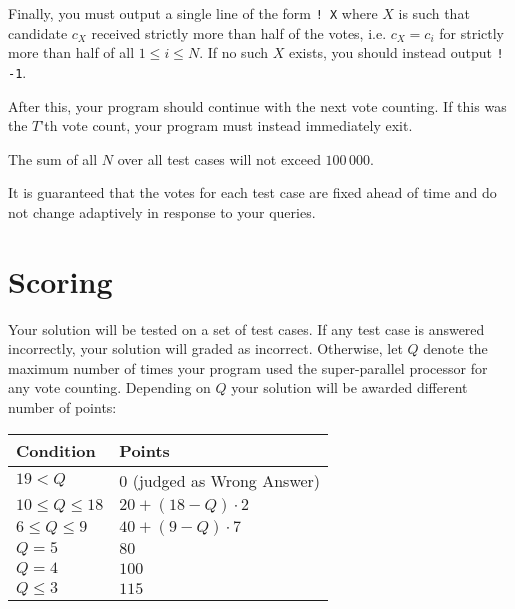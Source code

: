 Finally, you must output a single line of the form \texttt{! X} where $X$ is such that candidate $c_X$ received strictly more than half of the votes, i.e. $c_X = c_i$ for strictly more than half of all $1 \le i \le N$.
If no such $X$ exists, you should instead output \texttt{! -1}.

After this, your program should continue with the next vote counting.
If this was the $T$'th vote count, your program must instead immediately exit.

The sum of all $N$ over all test cases will not exceed $100\,000$.

It is guaranteed that the votes for each test case are fixed ahead of time and do not change adaptively in response to your queries.

\section*{Scoring}
Your solution will be tested on a set of test cases.
If any test case is answered incorrectly, your solution will graded as incorrect.
Otherwise, let $Q$ denote the maximum number of times your program used the super-parallel processor for any vote counting.
Depending on $Q$ your solution will be awarded different number of points:

\begin{center}
\begin{tabular}{|l|l|}
    \hline
    \textbf{Condition} & \textbf{Points} \\ \hline
    $19 < Q$ & $0$ (judged as Wrong Answer)\\ \hline
    $10 \le Q \le 18$ & $20 + (18 - Q) \cdot 2$ \\ \hline
    $6 \le Q \le 9$ & $40 + (9 - Q) \cdot 7$ \\ \hline
    $Q = 5$ & $80$ \\ \hline
    $Q = 4$ & $100$ \\ \hline
    $Q \le 3$ & $115$ \\ \hline
\end{tabular}
\end{center}
